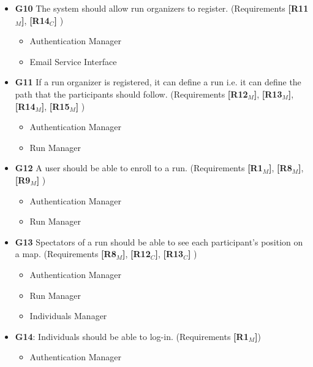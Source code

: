 \begin{itemize}
    
    \item \textbf{G10} The system should allow run organizers to register. \newline(Requirements \textbf{[R11$_M$]}, \textbf{[R14$_C$]} )
    \begin{itemize}
        \item Authentication Manager
        \item Email Service Interface
    \end{itemize}
    
    
    \item \textbf{G11} If a run organizer is registered, it can define a run i.e. it can define the path that the participants should follow. \newline(Requirements \textbf{[R12$_M$]}, \textbf{[R13$_M$]}, \textbf{[R14$_M$]}, \textbf{[R15$_M$]} )
    \begin{itemize}
        \item Authentication Manager
        \item Run Manager
    \end{itemize}
   
   
    \item \textbf{G12} A user should be able to enroll to a run. \newline(Requirements \textbf{[R1$_M$]}, \textbf{[R8$_M$]},  \textbf{[R9$_M$]}  )
    \begin{itemize}
        \item Authentication Manager
        \item Run Manager
    \end{itemize}   
   
    \item \textbf{G13} Spectators of a run should be able to see each participant's position on a map. \newline(Requirements \textbf{[R8$_M$]}, \textbf{[R12$_C$]}, \textbf{[R13$_C$]} )
    \begin{itemize}
        \item Authentication Manager
        \item Run Manager
        \item Individuals Manager
    \end{itemize} 
   
    \item \textbf{G14}: Individuals should be able to log-in.
    \newline(Requirements \textbf{[R1$_M$]})
    \begin{itemize}
        \item Authentication Manager
    \end{itemize}
    

\end{itemize}
